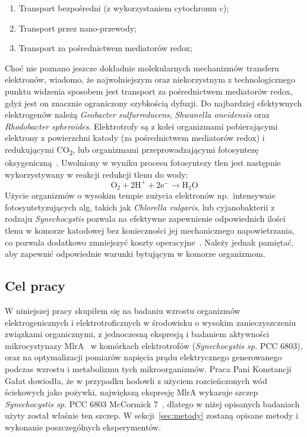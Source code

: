 \begin{enumerate}
    \item Transport bezpośredni (z wykorzystaniem cytochromu c);
    \item Transport przez nano-przewody;
    \item Transport za pośrednictwem mediatorów redox;
\end{enumerate}

Choć nie poznano jeszcze dokładnie molekularnych mechanizmów
transferu elektronów, wiadomo, że najwolniejszym oraz
niekorzystnym z technologicznego punktu widzenia sposobem jest
transport za pośrednictwem mediatorów redox, gdyż jest on znacznie
ograniczony szybkością dyfuzji.
Do najbardziej efektywnych elektrogenów należą
\textit{Geobacter sulfurreducens}, \textit{Shwanella oneidensis}
oraz \textit{Rhodobacter spheroides}.
Elektrotrofy są z kolei organizmami pobierającymi elektrony
z powierzchni katody (za pośrednictwem mediatorów redox)
i redukującymi CO\textsubscript{2}, lub organizmami przeprowadzającymi fotosyntezę
oksygeniczną~\cite{Santoro2017, Reddy2019}.
Uwolniony w wyniku procesu fotosyntezy tlen jest następnie
wykorzystywany w reakcji redukcji tlenu do wody:
\begin{equation}
    \label{eq:2}
    \mathrm{O_2 + 2H^+ + 2e^- \rightarrow H_2 O}
\end{equation}
Użycie organizmów o wysokim tempie zużycia elektronów np.\ intensywnie
fotosyntetyzujących alg, takich jak \textit{Chlorella vulgaris},
lub cyjanobakterii z rodzaju \textit{Synechocystis} pozwala na efektywne
zapewnienie odpowiednich ilości tlenu w komorze katodowej bez
konieczności jej mechanicznego napowietrzania, co pozwala dodatkowo
zmniejszyć koszty operacyjne~\cite{Reddy2019}.
Należy jednak pamiętać, aby zapewnić odpowiednie warunki
bytującym w komorze organizmom.

\subsection{Cel pracy}\label{subsec:badania}

W niniejszej pracy skupiłem się na badaniu wzrostu organizmów
elektrogenicznych i elektrotroficznych
w środowisku o wysokim zanieczyszczeniu związkami
organicznymi, z jednoczesną ekspresją i badaniem aktywności mikrocystynazy
MlrA~\cite{Dexter2018, Dexter2021} w komórkach elektrotrofów
(\textit{Synechocystis sp.} PCC 6803),
oraz na optymalizacji pomiarów napięcia prądu elektrycznego generowanego
podczas wzrostu i metabolizmu tych mikroorganizmów.
Praca Pani Konstancji Gałat dowiodła, że w przypadku
hodowli z użyciem rozcieńczonych wód ściekowych jako pożywki,
największą ekspresję MlrA wykazuje szczep
\textit{Synechocystis sp.} PCC 6803 McCormick 7~\cite{Galat2022},
dlatego w niżej opisanych badaniach użyty został właśnie ten szczep.
W sekcji~\ref{sec:metody} zostaną opisane metody i wykonanie
poszczególnych eksperymentów.